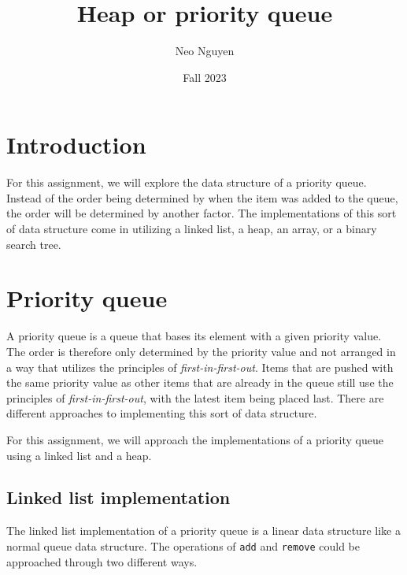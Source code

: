 \documentclass[a4paper,11pt]{article}
\begin{document}
\title{
    \textbf{Heap or priority queue}
}
\author{Neo Nguyen}
\date{Fall 2023}

\maketitle

\section*{Introduction}

    For this assignment, we will explore the data structure of a priority queue. Instead of the order being determined by when the item was added to the queue, the order will be determined by another factor. The implementations of this sort of data structure come in utilizing a linked list, a heap, an array, or a binary search tree. 
    
\section*{Priority queue}

    A priority queue is a queue that bases its element with a given priority value. The order is therefore only determined by the priority value and not arranged in a way that utilizes the principles of \textit{first-in-first-out}. Items that are pushed with the same priority value as other items that are already in the queue still use the principles of \textit{first-in-first-out}, with the latest item being placed last. There are different approaches to implementing this sort of data structure. 
    
    For this assignment, we will approach the implementations of a priority queue using a linked list and a heap.  
    
    \subsection*{Linked list implementation}

        The linked list implementation of a priority queue is a linear data structure like a  normal queue data structure. The operations of \texttt{add} and \texttt{remove} could be approached through two different ways. 
        
\end{document}

